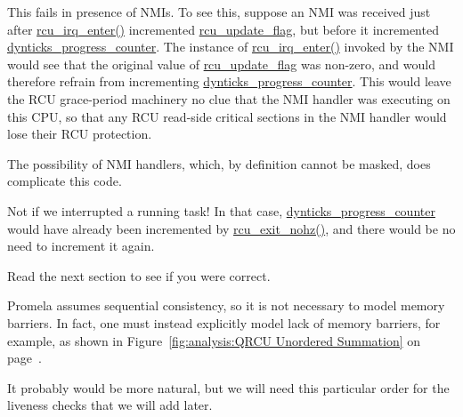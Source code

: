 
	This fails in presence of NMIs.
	To see this, suppose an NMI was received just after
	\url{rcu_irq_enter()} incremented \url{rcu_update_flag},
	but before it incremented \url{dynticks_progress_counter}.
	The instance of \url{rcu_irq_enter()} invoked by the NMI
	would see that the original value of \url{rcu_update_flag}
	was non-zero, and would therefore refrain from incrementing
	\url{dynticks_progress_counter}.
	This would leave the RCU grace-period machinery no clue that the
	NMI handler was executing on this CPU, so that any RCU read-side
	critical sections in the NMI handler would lose their RCU protection.

	The possibility of NMI handlers, which, by definition cannot
	be masked, does complicate this code.


	Not if we interrupted a running task!
	In that case, \url{dynticks_progress_counter} would
	have already been incremented by \url{rcu_exit_nohz()},
	and there would be no need to increment it again.


	Read the next section to see if you were correct.


	Promela assumes sequential consistency, so
	it is not necessary to model memory barriers.
	In fact, one must instead explicitly model lack of memory barriers,
	for example, as shown in
	Figure~\ref{fig:analysis:QRCU Unordered Summation} on
	page~\pageref{fig:analysis:QRCU Unordered Summation}.


	It probably would be more natural, but we will need
	this particular order for the liveness checks that we will add later.


